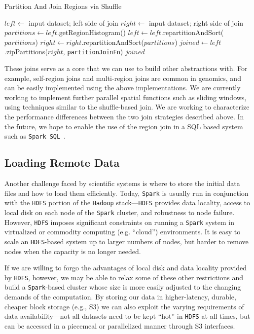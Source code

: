\documentclass{sig-alternate}
\begin{document}
\begin{algorithm}
\caption{Partition And Join Regions via Shuffle}
\label{alg:shuffle-region-join}
\begin{algorithmic}
\STATE $left \leftarrow$ input dataset; left side of join
\STATE $right \leftarrow$ input dataset; right side of join
\STATE $partitions \leftarrow left$.getRegionHistogram()
\STATE $left \leftarrow left$.repartitionAndSort($partitions$)
\STATE $right \leftarrow right$.repartitionAndSort($partitions$)
\STATE $joined \leftarrow left$.zipPartitions($right$, \texttt{partitionJoinFn})
\RETURN $joined$
\end{algorithmic}
\end{algorithm}

These joins serve as a core that we can use to build other abstractions with. For example, self-region joins and
multi-region joins are common in genomics, and can be easily implemented using the above implementations.
We are currently working to implement further parallel spatial functions such as sliding windows, using techniques
similar to the shuffle-based join. We are working to characterize the performance differences between the two
join strategies described above. In the future, we hope to enable the use of the region join in a SQL based system
such as \texttt{Spark SQL}~\cite{armbrust15}.

\subsection{Loading Remote Data}
\label{sec:loading-remote-data}

Another challenge faced by scientific systems is where to store the initial data files and how to load them
efficiently. Today, \texttt{Spark} is usually run in conjunction with the \texttt{HDFS} portion of the \texttt{Hadoop}
stack---\texttt{HDFS} provides data locality, access to local disk on each node of the \texttt{Spark} cluster, and
robustness to node failure. However, \texttt{HDFS} imposes significant constraints on running a \texttt{Spark} system
in virtualized or
commodity computing (e.g. ``cloud'') environments.  It is easy to scale an \texttt{HDFS}-based system up to
larger numbers of nodes, but harder to remove nodes when the capacity is no longer needed.  

If we are willing to forgo the advantages of local disk and data locality provided by \texttt{HDFS}, however, we
may be able to relax some of these other restrictions and build a \texttt{Spark}-based cluster whose size is more
easily adjusted to the changing demands of the computation. By storing our data in higher-latency,
durable, cheaper block storage (e.g., S3) we can also exploit the varying requirements of data \linebreak
availability---not all datasets need to be kept ``hot'' in \texttt{HDFS} at all times, but can be accessed in a
piecemeal or parallelized manner through S3 interfaces.
\end{document}
